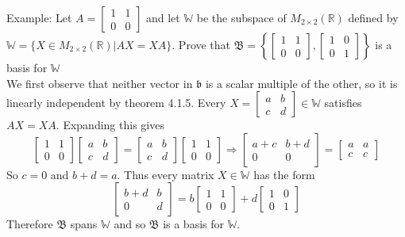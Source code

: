\documentclass[10pt,letter]{article}
\begin{document}
Example: Let $A=\begin{bmatrix}1&1\\0&0\end{bmatrix}$ and let $\mathbb{W}$ be the subspace of $M_{2\times 2}(\mathbb{R})$ defined by $\mathbb{W}=\{X\in M_{2\times 2}(\mathbb{R})|AX=XA\}$. Prove that $\mathfrak{B}=\left\{\begin{bmatrix}1&1\\0&0\end{bmatrix},\begin{bmatrix}1&0\\0&1\end{bmatrix}\right\}$ is a basis for $\mathbb{W}$ \\ 
We first observe that neither vector in $\mathfrak{b}$ is a scalar multiple of the other, so it is linearly independent by theorem 4.1.5. Every $X=\begin{bmatrix}a&b\\c&d\end{bmatrix}\in\mathbb{W}$ satisfies $AX=XA$. Expanding this gives  $$ \begin{bmatrix}1&1\\0&0\end{bmatrix}\begin{bmatrix}a&b\\c&d\end{bmatrix}=\begin{bmatrix}a&b\\c&d\end{bmatrix}\begin{bmatrix}1&1\\0&0\end{bmatrix}\Rightarrow\begin{bmatrix}a+c&b+d\\0&0\end{bmatrix}=\begin{bmatrix}a&a\\c&c\end{bmatrix}$$ So $c=0$ and $b+d=a$. Thus every matrix $X\in\mathbb{W}$ has the form $$\begin{bmatrix}b+d&b\\0&d\end{bmatrix}=b\begin{bmatrix}1&1\\0&0\end{bmatrix}+d\begin{bmatrix}1&0\\0&1\end{bmatrix}$$ Therefore $\mathfrak{B}$ spans $\mathbb{W}$ and so $\mathfrak{B}$ is a basis for $\mathbb{W}$. \\ 
\end{document}
